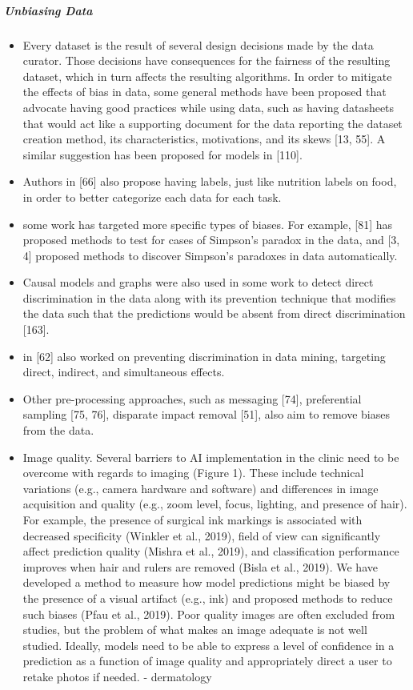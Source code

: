 \documentclass[12pt, a4paper, oneside]{book}   	%
\begin{document}
			\subparagraph{Unbiasing Data}
				\begin{itemize}
					\item Every dataset is the result of several design decisions made by the data curator. Those decisions have consequences for the fairness of the resulting dataset, which in turn affects the resulting algorithms. In order to mitigate the effects of bias in data, some general methods have been proposed that advocate having good practices while using data, such as having datasheets that would act like a supporting document for the data reporting the dataset creation method, its characteristics, motivations, and its skews [13, 55]. A similar suggestion has been proposed for models in [110].\autocite{Mehrabi_2021}
					\item Authors in [66] also propose having labels, just like nutrition labels on food, in order to better categorize each data for each task. \autocite{Mehrabi_2021}
					\item some work has targeted more specific types of biases. For example, [81] has proposed methods to test for cases of Simpson’s paradox in the data, and [3, 4] proposed methods to discover Simpson’s paradoxes in data automatically. \autocite{Mehrabi_2021}
					\item Causal models and graphs were also used in some work to detect direct discrimination in the data along with its prevention technique that modifies the data such that the predictions would be absent from direct discrimination [163].\autocite{Mehrabi_2021}
					\item in [62] also worked on preventing discrimination in data mining, targeting direct, indirect, and simultaneous effects.\autocite{Mehrabi_2021}
					\item Other pre-processing approaches, such as messaging [74], preferential sampling [75, 76], disparate impact removal [51], also aim to remove biases from the data. \autocite{Mehrabi_2021}
					
					
					\item Image quality. Several barriers to AI implementation in the clinic need to be overcome with regards to imaging (Figure 1). These include technical variations (e.g., camera hardware and software) and differences in image acquisition and quality (e.g., zoom level, focus, lighting, and presence of hair). For example, the presence of surgical ink markings is associated with decreased specificity (Winkler et al., 2019), field of view can significantly affect prediction quality (Mishra et al., 2019), and classification performance improves when hair and rulers are removed (Bisla et al., 2019). We have developed a method to measure how model predictions might be biased by the presence of a visual artifact (e.g., ink) and proposed methods to reduce such biases (Pfau et al., 2019). Poor quality images are often excluded from studies, but the problem of what makes an image adequate is not well studied. Ideally, models need to be able to express a level of confidence in a prediction as a function of image quality and appropriately direct a user to retake photos if needed. \autocite{Young_2020} - dermatology
				\end{itemize}
			
\end{document}
